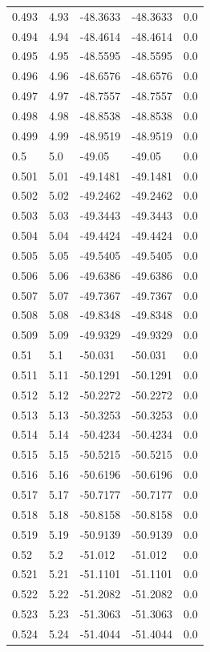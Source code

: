 \begin{table}[H]
\begin{tabular}{lllll}
0.493 & 4.93 & -48.3633 & -48.3633 & 0.0 \\
0.494 & 4.94 & -48.4614 & -48.4614 & 0.0 \\
0.495 & 4.95 & -48.5595 & -48.5595 & 0.0 \\
0.496 & 4.96 & -48.6576 & -48.6576 & 0.0 \\
0.497 & 4.97 & -48.7557 & -48.7557 & 0.0 \\
0.498 & 4.98 & -48.8538 & -48.8538 & 0.0 \\
0.499 & 4.99 & -48.9519 & -48.9519 & 0.0 \\
0.5 & 5.0 & -49.05 & -49.05 & 0.0 \\
0.501 & 5.01 & -49.1481 & -49.1481 & 0.0 \\
0.502 & 5.02 & -49.2462 & -49.2462 & 0.0 \\
0.503 & 5.03 & -49.3443 & -49.3443 & 0.0 \\
0.504 & 5.04 & -49.4424 & -49.4424 & 0.0 \\
0.505 & 5.05 & -49.5405 & -49.5405 & 0.0 \\
0.506 & 5.06 & -49.6386 & -49.6386 & 0.0 \\
0.507 & 5.07 & -49.7367 & -49.7367 & 0.0 \\
0.508 & 5.08 & -49.8348 & -49.8348 & 0.0 \\
0.509 & 5.09 & -49.9329 & -49.9329 & 0.0 \\
0.51 & 5.1 & -50.031 & -50.031 & 0.0 \\
0.511 & 5.11 & -50.1291 & -50.1291 & 0.0 \\
0.512 & 5.12 & -50.2272 & -50.2272 & 0.0 \\
0.513 & 5.13 & -50.3253 & -50.3253 & 0.0 \\
0.514 & 5.14 & -50.4234 & -50.4234 & 0.0 \\
0.515 & 5.15 & -50.5215 & -50.5215 & 0.0 \\
0.516 & 5.16 & -50.6196 & -50.6196 & 0.0 \\
0.517 & 5.17 & -50.7177 & -50.7177 & 0.0 \\
0.518 & 5.18 & -50.8158 & -50.8158 & 0.0 \\
0.519 & 5.19 & -50.9139 & -50.9139 & 0.0 \\
0.52 & 5.2 & -51.012 & -51.012 & 0.0 \\
0.521 & 5.21 & -51.1101 & -51.1101 & 0.0 \\
0.522 & 5.22 & -51.2082 & -51.2082 & 0.0 \\
0.523 & 5.23 & -51.3063 & -51.3063 & 0.0 \\
0.524 & 5.24 & -51.4044 & -51.4044 & 0.0 \\

\end{tabular}
\end{table}
